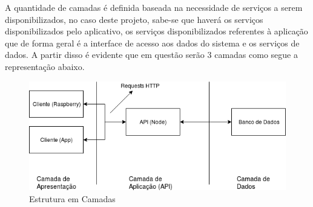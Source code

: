 \begin{apendicesenv}
A quantidade de camadas é definida baseada na necessidade de serviços a serem disponibilizados, no caso deste projeto, sabe-se que haverá os serviços disponibilizados pelo aplicativo, os serviços disponibilizados referentes à aplicação que de forma geral é a interface de acesso aos dados do sistema e os serviços de dados. A partir disso é evidente que em questão serão 3 camadas como segue a representação abaixo.

\begin{figure}[!ht]
	\centering
		\includegraphics[scale=0.6]{figuras/software/3-estrutura-camadas.png}
	\caption{Estrutura em Camadas}
\end{figure}


\end{apendicesenv}
